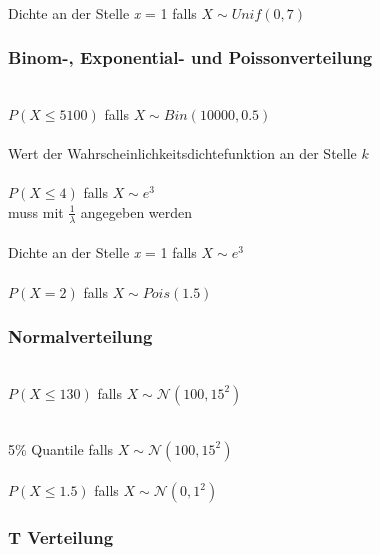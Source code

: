 \documentclass{article}
\begin{document}
\begin{multicols*}{3}
 \\
Dichte an der Stelle \textit{x} = 1 falls $X \sim Unif(0, 7)$

\subsubsection*{Binom-, Exponential- und Poissonverteilung}

 \\
$P(X \leq 5100)$ falls $X \sim Bin(10000, 0.5)$ \\

 \\
Wert der Wahrscheinlichkeitsdichtefunktion an der Stelle $k$ \\

 \\
$P(X \leq 4)$ falls $X \sim e^{3}$ \\
\colorbox{red!20!white}{ muss mit $\frac{1}{\lambda}$ angegeben werden}\\

 \\
Dichte an der Stelle \textit{x} = 1 falls $X \sim e^{3}$ \\

 \\
$P(X = 2)$ falls $X \sim Pois(1.5)$

\subsubsection*{Normalverteilung}

 \\
$P(X \leq 130)$ falls $X \sim \mathcal{N}(100, 15^2)$

 \\
5\% Quantile falls $X \sim \mathcal{N}(100, 15^2)$ \\

 \\
$P(X \leq 1.5)$ falls $X \sim \mathcal{N}(0, 1^2)$

\subsubsection*{T Verteilung}


\end{multicols*}
\end{document}
